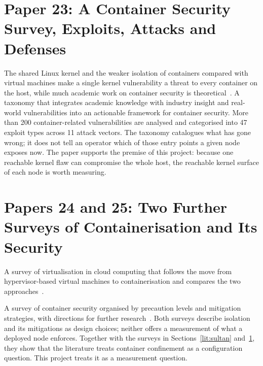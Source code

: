 \section{Paper 23: A Container Security Survey, Exploits, Attacks and Defenses}
\label{lit:jarkas}

 The shared Linux kernel and the weaker isolation of containers compared with virtual machines make a single kernel vulnerability a threat to every container on the host, while much academic work on container security is theoretical~\cite{jarkas2025}.
 A taxonomy that integrates academic knowledge with industry insight and real-world vulnerabilities into an actionable framework for container security.
 More than 200 container-related vulnerabilities are analysed and categorised into 47 exploit types across 11 attack vectors.
 The taxonomy catalogues what has gone wrong; it does not tell an operator which of those entry points a given node exposes now.
 The paper supports the premise of this project: because one reachable kernel flaw can compromise the whole host, the reachable kernel surface of each node is worth measuring.

\section{Papers 24 and 25: Two Further Surveys of Containerisation and Its Security}
\label{lit:further}

 A survey of virtualisation in cloud computing that follows the move from hypervisor-based virtual machines to containerisation and compares the two approaches~\cite{bhardwaj2021}.


 A survey of container security organised by precaution levels and mitigation strategies, with directions for further research~\cite{devipriya2023}.
 Both surveys describe isolation and its mitigations as design choices; neither offers a measurement of what a deployed node enforces.
 Together with the surveys in Sections~\ref{lit:sultan} and~\ref{lit:jarkas}, they show that the literature treats container confinement as a configuration question. This project treats it as a measurement question.

